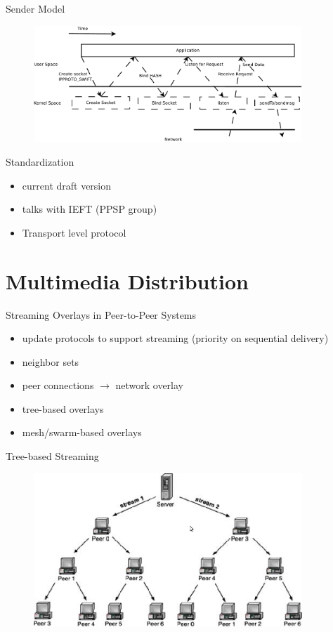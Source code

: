 \documentclass{beamer}
\begin{document}
\begin{frame}{Sender Model}
  \begin{figure}
    \includegraphics[width=0.9\textwidth]{img/multiparty-sendmsg}
  \end{figure}
\end{frame}

\begin{frame}{Standardization}
  \begin{itemize}
    \item current draft version
    \item talks with IEFT (PPSP group)
    \item Transport level protocol
  \end{itemize}
\end{frame}

\section{Multimedia Distribution}

\begin{frame}{Streaming Overlays in Peer-to-Peer Systems}
  \begin{itemize}
    \item update protocols to support streaming (priority on sequential
    delivery)
    \item neighbor sets
    \item peer connections $\rightarrow$ network overlay
    \item tree-based overlays
    \item mesh/swarm-based overlays
  \end{itemize}
\end{frame}

\begin{frame}{Tree-based Streaming}
  \begin{figure}
    \includegraphics[width=0.9\textwidth]{img/multi-stream-tree}
  \end{figure}
\end{frame}
\end{document}
